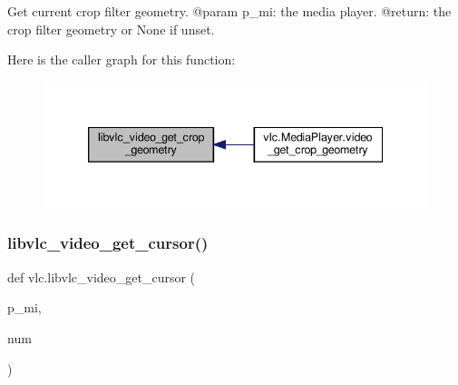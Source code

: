 \begin{DoxyVerb}Get current crop filter geometry.
@param p_mi: the media player.
@return: the crop filter geometry or None if unset.
\end{DoxyVerb}
 Here is the caller graph for this function\+:
\nopagebreak
\begin{figure}[H]
\begin{center}
\leavevmode
\includegraphics[width=339pt]{namespacevlc_a90ce254d86107126899a45083478af1c_icgraph}
\end{center}
\end{figure}
\mbox{\label{namespacevlc_a228937b07392d999417491489e90f7f0}} 
\subsubsection{\texorpdfstring{libvlc\+\_\+video\+\_\+get\+\_\+cursor()}{libvlc\_video\_get\_cursor()}}
{\footnotesize\ttfamily def vlc.\+libvlc\+\_\+video\+\_\+get\+\_\+cursor (\begin{DoxyParamCaption}\item[{}]{p\+\_\+mi,  }\item[{}]{num }\end{DoxyParamCaption})}

